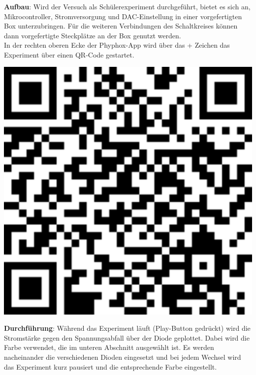 \documentclass[../main.tex]{subfiles}
\begin{document}
\begin{tcolorbox}
\vspace{0.5cm}
\begin{minipage}[c]{0.75\textwidth}
    \textbf{Aufbau}: Wird der Versuch als Schülerexperiment durchgeführt, bietet es sich an, Mikrocontroller, Stromversorgung und DAC-Einstellung in einer vorgefertigten Box unterzubringen. Für die weiteren Verbindungen des Schaltkreises können dann vorgefertigte Steckplätze an der Box genutzt werden.\\
In der rechten oberen Ecke der Phyphox-App wird über das + Zeichen das Experiment über einen QR-Code gestartet. 
    \end{minipage}
    \hspace{0.5cm}
    \begin{minipage}[c]{0.2\textwidth}
        \centering
        \includegraphics[width=1\textwidth]{img/qr_code_phyphox}
    \end{minipage}

    \vspace{0.5cm}
    \textbf{Durchführung}: Während das Experiment läuft (Play-Button gedrückt) wird die Stromstärke gegen den Spannungsabfall über der Diode geplottet. Dabei wird die Farbe verwendet, die im unteren Abschnitt ausgewählt ist. Es werden nacheinander die verschiedenen Dioden eingesetzt und bei jedem Wechsel wird das Experiment kurz pausiert und die entsprechende Farbe eingestellt.


\end{tcolorbox}
\end{document}
